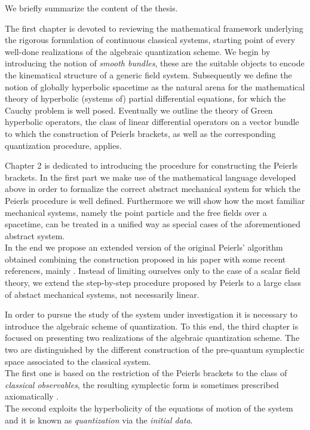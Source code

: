 \documentclass[Main]{subfiles}
\begin{document}
\vspace{3mm}
We briefly summarize the content of the thesis.

The first chapter is devoted to reviewing the mathematical framework  underlying the rigorous formulation of continuous classical systems, starting point of every \ifToninus well-done \fi realizations of the algebraic quantization scheme.
We begin by introducing the notion of \emph{smooth bundles}, these are the suitable objects to encode the kinematical structure of a generic field system.
Subsequently we define the notion of globally hyperbolic spacetime as  the natural arena for the mathematical theory of hyperbolic (systems of) partial differential equations, for which the Cauchy problem is well posed.
Eventually we outline the theory of Green hyperbolic operators, the class of linear differential operators on a vector bundle to which the construction of Peierls brackets, as well as the corresponding quantization procedure, applies.

Chapter 2 is dedicated to introducing the procedure for constructing the Peierls brackets.
In the first part we make use of the mathematical language developed above in order to formalize the correct abstract mechanical system for which the Peierls procedure is well defined. Furthermore we will show how the most familiar mechanical systems, namely the point particle and the free fields over a spacetime, can be treated in a unified way as special cases of the aforementioned abstract system.
\\
In the end we propose an extended version of the original Peierls' algorithm obtained combining the construction proposed in his paper\cite{Peierls1952} with some recent references, mainly \cite{Marolf1993}\cite{Dewitt1999}\cite{Forger2005}\cite{Sharan2010}\cite{Khavkine2014}.
Instead of limiting ourselves only to the case of a scalar field theory, we extend the step-by-step procedure proposed by Peierls to a large class of abstact mechanical systems, not necessarily linear.

In order to pursue the study of the system under investigation it is necessary to introduce the algebraic scheme of quantization.
To this end, the third chapter is focused on presenting two realizations of the algebraic quantization scheme.
The two are distinguished by the different construction of the pre-quantum symplectic space associated to the classical system.
\\
The first one is based on the restriction of the Peierls brackets to the class of \emph{classical observables}, the resulting symplectic form is sometimes prescribed axiomatically \cite{Dewitt1999}\cite{Esposito}\cite{Benini}.\\
The second exploits the hyperbolicity of the equations of motion of the system and it is known as \emph{quantization} via the \emph{initial data}\cite{Wald1994}.
\end{document}
